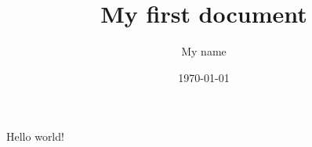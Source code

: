 \documentclass{article}
\begin{document}
    \title{My first document}
    \author{My name}
    \date{\today}
    \maketitle

    Hello world!
\end{document}
